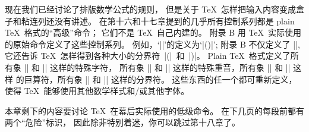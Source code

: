 \danger 现在我们已经讨论了排版数学公式的规则，
但是关于 \TeX\ 怎样把输入内容变成盒子和粘连列还没有讲述。%
在第十六和十七章提到的几乎所有控制系列都是 plain \TeX\ 格式的``高级''命令；
它们不是 \TeX\ 自己内建的。%
附录 B 用 \TeX\ 实际使用的原始命令定义了这些控制系列。%
例如，`|\choose|'的定义为`|\atopwithdelims()|';
附录 B 不仅定义了 |\choose|, 它还告诉 \TeX\ 怎样得到各种大小的分界符\hbox{~|(| 和 |)|。}%
Plain \TeX\ 格式定义了所有象 |\alpha| 和 |\mapsto| 这样的特殊字符，
所有象 |\tilde| 和 |\widehat| 这样的特殊重音，所有象 |\sum| 和 |\int| 这样%
的巨算符，所有象 |\lfloor| 和 |\vert| 这样的分界符。
这些东西的任一个都可重新定义，使得 \TeX\ 能够使用其他数学样式和/或其他字体。

\danger \1本章剩下的内容要讨论 \TeX\ 在幕后实际使用的低级命令。%
在下几页的每段前都有两个``危险''标识，
因此除非特别着迷，你可以跳过第十八章了。

